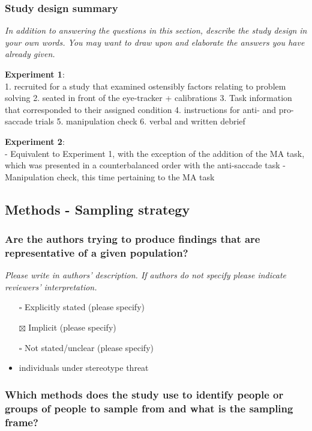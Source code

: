 \documentclass[
  doc, a4paper]{apa7}
\begin{document}
\subsubsection{Study design summary}\label{study-design-summary}

\emph{In addition to answering the questions in this section, describe the study design in your own words. You may want to draw upon and elaborate the answers you have already given.}

\textbf{Experiment 1}:\\
1. recruited for a study that examined ostensibly factors relating to problem solving
2. seated in front of the eye-tracker + calibrations
3. Task information that corresponded to their assigned condition
4. instructions for anti- and pro-saccade trials
5. manipulation check
6. verbal and written debrief

\textbf{Experiment 2}:\\
- Equivalent to Experiment 1, with the exception of the addition of the MA task, which was presented in a counterbalanced order with the anti-saccade task
- Manipulation check, this time pertaining to the MA task

\subsection{Methods - Sampling strategy}\label{methods---sampling-strategy}

\subsubsection{Are the authors trying to produce findings that are representative of a given population?}\label{are-the-authors-trying-to-produce-findings-that-are-representative-of-a-given-population}

\emph{Please write in authors' description. If authors do not specify please indicate reviewers' interpretation.}

\begin{itemize}
\item[$\square$]
  Explicitly stated (please specify)
\item[$\boxtimes$]
  Implicit (please specify)
\item[$\square$]
  Not stated/unclear (please specify)
\item
  individuals under stereotype threat
\end{itemize}

\subsubsection{Which methods does the study use to identify people or groups of people to sample from and what is the sampling frame?}\label{which-methods-does-the-study-use-to-identify-people-or-groups-of-people-to-sample-from-and-what-is-the-sampling-frame}
\end{document}
